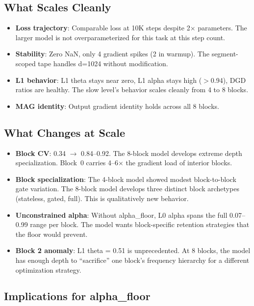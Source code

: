 \documentclass[11pt,a4paper]{article}
\begin{document}
\subsection{What Scales Cleanly}

\begin{itemize}
    \item \textbf{Loss trajectory}: Comparable loss at 10K steps despite 2$\times$ parameters. The larger model is not overparameterized for this task at this step count.
    \item \textbf{Stability}: Zero NaN, only 4 gradient spikes (2 in warmup). The segment-scoped tape handles d=1024 without modification.
    \item \textbf{L1 behavior}: L1 theta stays near zero, L1 alpha stays high ($>$0.94), DGD ratios are healthy. The slow level's behavior scales cleanly from 4 to 8 blocks.
    \item \textbf{MAG identity}: Output gradient identity holds across all 8 blocks.
\end{itemize}

\subsection{What Changes at Scale}

\begin{itemize}
    \item \textbf{Block CV}: 0.34 $\to$ 0.84--0.92. The 8-block model develops extreme depth specialization. Block~0 carries 4--6$\times$ the gradient load of interior blocks.
    \item \textbf{Block specialization}: The 4-block model showed modest block-to-block gate variation. The 8-block model develops three distinct block archetypes (stateless, gated, full). This is qualitatively new behavior.
    \item \textbf{Unconstrained alpha}: Without alpha\_floor, L0 alpha spans the full 0.07--0.99 range per block. The model wants block-specific retention strategies that the floor would prevent.
    \item \textbf{Block 2 anomaly}: L1 theta = 0.51 is unprecedented. At 8 blocks, the model has enough depth to ``sacrifice'' one block's frequency hierarchy for a different optimization strategy.
\end{itemize}

\subsection{Implications for alpha\_floor}
\end{document}

